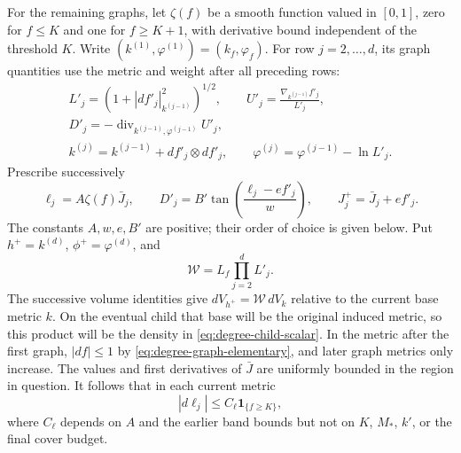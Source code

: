 For the remaining graphs, let $\zeta(f)$ be a smooth function valued in
$[0,1]$, zero for $f\le K$ and one for $f\ge K+1$, with derivative bound
independent of the threshold $K$.  Write
$(k^{(1)},\varphi^{(1)})=(k_f,\varphi_f)$.  For row $j=2,\ldots,d$, its
graph quantities use the metric and weight after all preceding rows:
\[
 \begin{gathered}
 L'_j=(1+|df'_j|_{k^{(j-1)}}^2)^{1/2},\qquad
 U'_j=\frac{\nabla_{k^{(j-1)}}f'_j}{L'_j},\\
 D'_j=-\operatorname{div}_{k^{(j-1)},\varphi^{(j-1)}}U'_j,\\
 k^{(j)}=k^{(j-1)}+df'_j\otimes df'_j,\qquad
 \varphi^{(j)}=\varphi^{(j-1)}-\ln L'_j.
 \end{gathered}
\]
Prescribe successively
\begin{equation}\label{eq:degree-row-graph}
  \ell_j=A\zeta(f)\bar J_j,\qquad
  D'_j=B'\tan\left(\frac{\ell_j-e f'_j}{w}\right),\qquad
  J_j^+=\bar J_j+e f'_j.
\end{equation}
The constants $A,w,e,B'$ are positive; their order of choice is given
below.  Put $h^+=k^{(d)}$, $\phi^+=\varphi^{(d)}$, and
\[
                         \mathcal W=L_f\prod_{j=2}^dL'_j.
\]
The successive volume identities give $dV_{h^+}=\mathcal W\,dV_k$
relative to the current base metric $k$.  On the eventual child that
base will be the original induced metric, so this product will be the
density in \eqref{eq:degree-child-scalar}.  In the metric after the first graph, $|df|\le1$ by
\eqref{eq:degree-graph-elementary}, and later graph metrics only
increase.  The values and first derivatives of $\bar J$ are uniformly
bounded in the region in question.  It follows that in each current
metric
\begin{equation}\label{eq:degree-ell-bound}
             |d\ell_j|\le C_\ell\mathbf1_{\{f\ge K\}},
\end{equation}
where $C_\ell$ depends on $A$ and the earlier band bounds but not on
$K$, $M_*$, $k'$, or the final cover budget.

